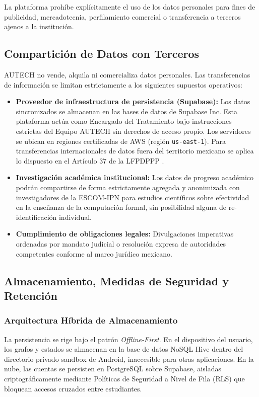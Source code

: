 La plataforma prohíbe explícitamente el uso de los datos personales para fines de publicidad, mercadotecnia, perfilamiento comercial o transferencia a terceros ajenos a la institución.

\subsection{Compartición de Datos con Terceros}
\label{subsec:privacidad_transferencia}

AUTECH no vende, alquila ni comercializa datos personales. Las transferencias de información se limitan estrictamente a los siguientes supuestos operativos:
\begin{itemize}
    \item \textbf{Proveedor de infraestructura de persistencia (Supabase):} Los datos sincronizados se almacenan en las bases de datos de Supabase Inc. Esta plataforma actúa como Encargado del Tratamiento bajo instrucciones estrictas del Equipo AUTECH sin derechos de acceso propio. Los servidores se ubican en regiones certificadas de AWS (región \texttt{us-east-1}). Para transferencias internacionales de datos fuera del territorio mexicano se aplica lo dispuesto en el Artículo 37 de la LFPDPPP \cite{supabase2024}.
    \item \textbf{Investigación académica institucional:} Los datos de progreso académico podrán compartirse de forma estrictamente agregada y anonimizada con investigadores de la ESCOM-IPN para estudios científicos sobre efectividad en la enseñanza de la computación formal, sin posibilidad alguna de re-identificación individual.
    \item \textbf{Cumplimiento de obligaciones legales:} Divulgaciones imperativas ordenadas por mandato judicial o resolución expresa de autoridades competentes conforme al marco jurídico mexicano.
\end{itemize}

\subsection{Almacenamiento, Medidas de Seguridad y Retención}
\label{subsec:privacidad_seguridad}

\subsubsection{Arquitectura Híbrida de Almacenamiento}
La persistencia se rige bajo el patrón \textit{Offline-First}. En el dispositivo del usuario, los grafos y estados se almacenan en la base de datos NoSQL Hive dentro del directorio privado sandbox de Android, inaccesible para otras aplicaciones. En la nube, las cuentas se persisten en PostgreSQL sobre Supabase, aisladas criptográficamente mediante Políticas de Seguridad a Nivel de Fila (RLS) que bloquean accesos cruzados entre estudiantes.

